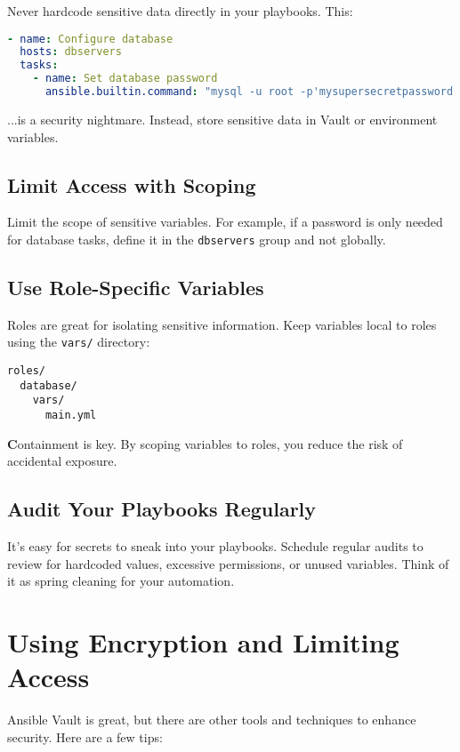 Never hardcode sensitive data directly in your playbooks. This:
\begin{lstlisting}[language=yaml, caption=Don't Do This]
- name: Configure database
  hosts: dbservers
  tasks:
    - name: Set database password
      ansible.builtin.command: "mysql -u root -p'mysupersecretpassword' -e 'SET PASSWORD...'"
\end{lstlisting}

...is a security nightmare. Instead, store sensitive data in Vault or environment variables.

\subsection{Limit Access with Scoping}

Limit the scope of sensitive variables. For example, if a password is only needed for database tasks, define it in the \texttt{dbservers} group and not globally.

\subsection{Use Role-Specific Variables}

Roles are great for isolating sensitive information. Keep variables local to roles using the \texttt{vars/} directory:
\begin{verbatim}
roles/
  database/
    vars/
      main.yml
\end{verbatim}

\textbf{C}ontainment is key. By scoping variables to roles, you reduce the risk of accidental exposure.

\subsection{Audit Your Playbooks Regularly}

It's easy for secrets to sneak into your playbooks. Schedule regular audits to review for hardcoded values, excessive permissions, or unused variables. Think of it as spring cleaning for your automation.


\section{Using Encryption and Limiting Access}

Ansible Vault is great, but there are other tools and techniques to enhance security. Here are a few tips:

